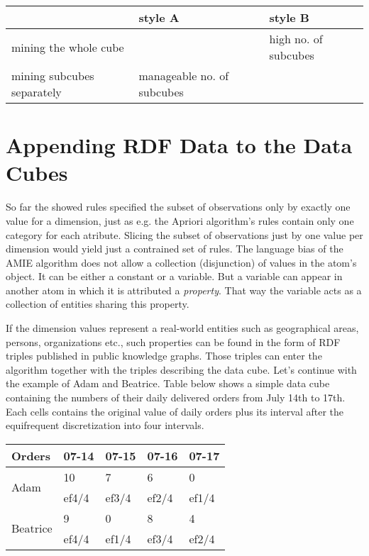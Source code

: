 \begin{table}[h]
\centering
\begin{tabular}{l|ll}
                           & style A                       & style B                  \\ 
\hline
mining the whole cube      &                               & high no. of subcubes  \\
mining subcubes separately & manageable no. of subcubes &                         
\end{tabular}
\end{table}

\section{Appending RDF Data to the Data Cubes}

So far the showed rules specified the subset of observations only by exactly one value for a dimension, just as e.g. the Apriori algorithm's rules contain only one category for each atribute. Slicing the subset of observations just by one value per dimension would yield just a contrained set of rules. The language bias of the AMIE algorithm does not allow a collection (disjunction) of values in the atom's object. It can be either a constant or a variable. But a variable can appear in another atom in which it is attributed a \textit{property}. That way the variable acts as a collection of entities sharing this property.

If the dimension values represent a real-world entities such as geographical areas, persons, organizations etc., such properties can be found in the form of RDF triples published in public knowledge graphs. Those triples can enter the algorithm together with the triples describing the data cube. Let's continue with the example of Adam and Beatrice. Table below shows a simple data cube containing the numbers of their daily delivered orders from July 14th to 17th. Each cells contains the original value of daily orders plus its interval after the equifrequent discretization into four intervals.

\begin{table}[h]
\centering
\begin{tabular}{l|llll}
Orders                    & 07-14 & 07-15 & 07-16 & 07-17  \\ 
\hline
\multirow{2}{*}{Adam}     & 10    & 7     & 6     & 0      \\
                         & ef4/4 & ef3/4 & ef2/4 & ef1/4  \\
\multirow{2}{*}{Beatrice} & 9     & 0     & 8     & 4      \\
                          & ef4/4 & ef1/4 & ef3/4 & ef2/4 
\end{tabular}
\end{table}

